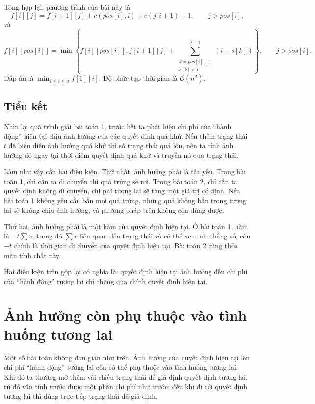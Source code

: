 \documentclass[11pt]{article}
\newcommand{\Oh}{\mathcal{O}}
\begin{document}
Tổng hợp lại, phương trình của bài này là
\[
  f[i][j]=f[i+1][j]+c(\mathit{pos}[i],i)+c(j,i+1)-1,
  \qquad j>\mathit{pos}[i],
\]
và
\[
  f[i][\mathit{pos}[i]]
  =
  \min\left\{
    f[i][\mathit{pos}[i]],
    f[i+1][j]
    +\sum_{\substack{k=\mathit{pos}[i]+1\\ s[k]<i}}^{j-1}(i-s[k])
  \right\},
  \qquad j>\mathit{pos}[i].
\]
Đáp án là \(\min_{1\le i\le n} f[1][i]\). Độ phức tạp thời gian là
\(\Oh(n^2)\).

\subsection*{Tiểu kết}

Nhìn lại quá trình giải bài toán 1, trước hết ta phát hiện chi phí của
``hành động'' hiện tại chịu ảnh hưởng của các quyết định quá khứ. Nếu thêm
trạng thái $t$ để biểu diễn ảnh hưởng quá khứ thì số trạng thái quá lớn, nên
ta tính ảnh hưởng đó ngay tại thời điểm quyết định quá khứ và truyền nó qua
trạng thái.

Làm như vậy cần hai điều kiện. Thứ nhất, ảnh hưởng phải là tất yếu. Trong bài
toán 1, chỉ cần ta di chuyển thì quả trứng sẽ rơi. Trong bài toán 2, chỉ cần
ta quyết định không di chuyển, chi phí tương lai sẽ tăng một giá trị cố định.
Nếu bài toán 1 không yêu cầu bắn mọi quả trứng, những quả không bắn trong
tương lai sẽ không chịu ảnh hưởng, và phương pháp trên không còn dùng được.

Thứ hai, ảnh hưởng phải là một hàm của quyết định hiện tại. Ở bài toán 1, hàm
là $-t\sum v$; trong đó $\sum v$ liên quan đến trạng thái và có thể xem như
hằng số, còn $-t$ chính là thời gian di chuyển của quyết định hiện tại. Bài
toán 2 cũng thỏa mãn tính chất này.

Hai điều kiện trên gộp lại có nghĩa là: quyết định hiện tại ảnh hưởng đến chi
phí của ``hành động'' tương lai chỉ thông qua chính quyết định hiện tại.

\section{Ảnh hưởng còn phụ thuộc vào tình huống tương lai}

Một số bài toán không đơn giản như trên. Ảnh hưởng của quyết định hiện tại lên
chi phí ``hành động'' tương lai còn có thể phụ thuộc vào tình huống tương lai.
Khi đó ta thường mở thêm vài chiều trạng thái để giả định quyết định tương
lai, từ đó vẫn tính trước được một phần chi phí như trước; đến khi đi tới
quyết định tương lai thì dùng trực tiếp trạng thái đã giả định.
\end{document}
